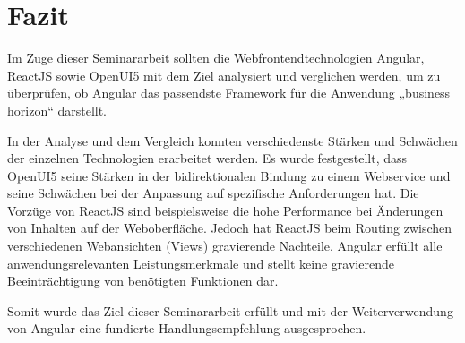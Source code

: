 

\chapter{Fazit}

Im Zuge dieser Seminararbeit sollten die Webfrontendtechnologien Angular, ReactJS sowie OpenUI5 mit dem Ziel analysiert und verglichen werden, um zu überprüfen, ob Angular das passendste Framework für die Anwendung „business horizon“ darstellt. 

In der Analyse und dem Vergleich konnten verschiedenste Stärken und Schwächen der einzelnen Technologien erarbeitet werden. Es wurde festgestellt, dass OpenUI5 seine Stärken in der bidirektionalen Bindung zu einem Webservice und seine Schwächen bei der Anpassung auf spezifische Anforderungen hat. Die Vorzüge von ReactJS sind beispielsweise die hohe Performance bei Änderungen von Inhalten auf der Weboberfläche. Jedoch hat ReactJS beim Routing zwischen verschiedenen Webansichten (Views) gravierende Nachteile. Angular erfüllt alle anwendungsrelevanten Leistungsmerkmale und stellt keine gravierende Beeinträchtigung von benötigten Funktionen dar. 

Somit wurde das Ziel dieser Seminararbeit erfüllt und mit der Weiterverwendung von Angular eine fundierte Handlungsempfehlung ausgesprochen.
